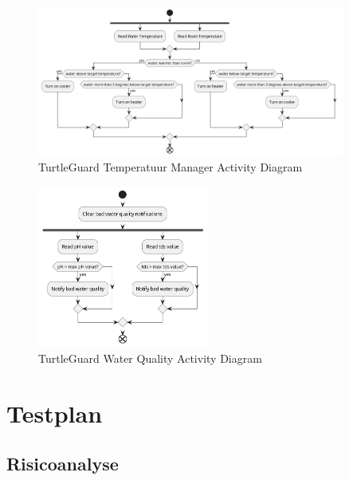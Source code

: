 \documentclass[a4paper]{report}
\newcommand{\turtleguard}{\mbox{TurtleGuard\texttrademark}\xspace}
\begin{document}
\begin{figure}[h]
  \centering
  \includegraphics[width=0.9\textwidth]{Images/ActivityDiagramTemp.png}
  \caption{\turtleguard Temperatuur Manager Activity Diagram}
  \label{fig:activitydiagramtemperature}
\end{figure}

\begin{figure}[h]
  \centering
  \includegraphics[width=0.5\textwidth]{Images/ActivityDiagramQuality.png}
  \caption{\turtleguard Water Quality Activity Diagram}
  \label{fig:activitydiagram}
\end{figure}

\chapter{Testplan}
\section{Risicoanalyse}
\end{document}
